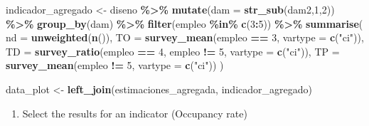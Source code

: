 \documentclass[
  12pt,
]{book}
\newenvironment{Shaded}{\begin{snugshade}}{\end{snugshade}}
\newcommand{\AttributeTok}[1]{\textcolor[rgb]{0.13,0.29,0.53}{#1}}
\newcommand{\DecValTok}[1]{\textcolor[rgb]{0.00,0.00,0.81}{#1}}
\newcommand{\FunctionTok}[1]{\textcolor[rgb]{0.13,0.29,0.53}{\textbf{#1}}}
\newcommand{\NormalTok}[1]{#1}
\newcommand{\OtherTok}[1]{\textcolor[rgb]{0.56,0.35,0.01}{#1}}
\newcommand{\SpecialCharTok}[1]{\textcolor[rgb]{0.81,0.36,0.00}{\textbf{#1}}}
\newcommand{\StringTok}[1]{\textcolor[rgb]{0.31,0.60,0.02}{#1}}
\providecommand{\tightlist}{%
  \setlength{\itemsep}{0pt}\setlength{\parskip}{0pt}}
\begin{document}
\begin{Shaded}
\begin{Highlighting}[]
\NormalTok{indicador\_agregado }\OtherTok{\textless{}{-}}
\NormalTok{  diseno }\SpecialCharTok{\%\textgreater{}\%} 
   \FunctionTok{mutate}\NormalTok{(}\AttributeTok{dam =} \FunctionTok{str\_sub}\NormalTok{(dam2,}\DecValTok{1}\NormalTok{,}\DecValTok{2}\NormalTok{)) }\SpecialCharTok{\%\textgreater{}\%} 
  \FunctionTok{group\_by}\NormalTok{(dam) }\SpecialCharTok{\%\textgreater{}\%} 
  \FunctionTok{filter}\NormalTok{(empleo }\SpecialCharTok{\%in\%} \FunctionTok{c}\NormalTok{(}\DecValTok{3}\SpecialCharTok{:}\DecValTok{5}\NormalTok{)) }\SpecialCharTok{\%\textgreater{}\%}
  \FunctionTok{summarise}\NormalTok{(}
     \AttributeTok{nd =} \FunctionTok{unweighted}\NormalTok{(}\FunctionTok{n}\NormalTok{()),}
    \AttributeTok{TO =} \FunctionTok{survey\_mean}\NormalTok{(empleo }\SpecialCharTok{==} \DecValTok{3}\NormalTok{,}
                     \AttributeTok{vartype =} \FunctionTok{c}\NormalTok{(}\StringTok{"ci"}\NormalTok{)),}
    \AttributeTok{TD =} \FunctionTok{survey\_ratio}\NormalTok{(empleo }\SpecialCharTok{==} \DecValTok{4}\NormalTok{,}
\NormalTok{                      empleo }\SpecialCharTok{!=} \DecValTok{5}\NormalTok{,}
                      \AttributeTok{vartype =} \FunctionTok{c}\NormalTok{(}\StringTok{"ci"}\NormalTok{)),}
    \AttributeTok{TP =} \FunctionTok{survey\_mean}\NormalTok{(empleo }\SpecialCharTok{!=} \DecValTok{5}\NormalTok{,}
                     \AttributeTok{vartype =} \FunctionTok{c}\NormalTok{(}\StringTok{"ci"}\NormalTok{))}
\NormalTok{  ) }

\NormalTok{data\_plot }\OtherTok{\textless{}{-}} \FunctionTok{left\_join}\NormalTok{(estimaciones\_agregada, indicador\_agregado)}
\end{Highlighting}
\end{Shaded}

\begin{enumerate}
\def\labelenumi{\arabic{enumi}.}
\setcounter{enumi}{2}
\tightlist
\item
  Select the results for an indicator (Occupancy rate)
\end{enumerate}
\end{document}
